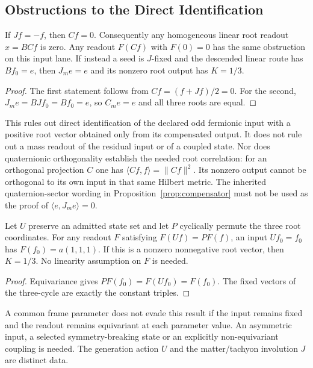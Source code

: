 \subsection{Obstructions to the Direct Identification}
\label{v480:hc-mass-obstructions}

\begin{proposition}
\label{v480:hc-mass-odd-obstruction}
If $Jf=-f$, then $Cf=0$. Consequently any homogeneous linear
root readout $x=BCf$ is zero. Any readout $F(Cf)$ with $F(0)=0$
has the same obstruction on this input lane. If instead a seed is
$J$-fixed and the descended linear route has $Bf_0=e$, then
$J_me=e$ and its nonzero root output has $K=1/3$.
\end{proposition}
\begin{proof}
The first statement follows from $Cf=(f+Jf)/2=0$.
For the second, $J_me=BJf_0=Bf_0=e$, so $C_me=e$ and
all three roots are equal.
\end{proof}

This rules out direct identification of the declared odd fermionic
input with a positive root vector obtained only from its compensated
output. It does not rule out a mass readout of the residual input or
of a coupled state. Nor does quaternionic orthogonality establish the
needed root correlation: for an orthogonal projection $C$ one has
$\langle Cf,f\rangle=\|Cf\|^2$. Its nonzero output cannot be
orthogonal to its own input in that same Hilbert metric. The inherited
quaternion-sector wording in Proposition~\ref{prop:compensator} must
not be used as the proof of $\langle e,J_me\rangle=0$.

\begin{proposition}
\label{v480:hc-mass-equivariant-obstruction}
Let $U$ preserve an admitted state set and let $P$ cyclically permute
the three root coordinates. For any readout $F$ satisfying
$F(Uf)=PF(f)$, an input $Uf_0=f_0$ has
$F(f_0)=a(1,1,1)$. If this is a nonzero nonnegative root vector,
then $K=1/3$. No linearity assumption on $F$ is needed.
\end{proposition}
\begin{proof}
Equivariance gives $PF(f_0)=F(Uf_0)=F(f_0)$. The fixed vectors
of the three-cycle are exactly the constant triples.
\end{proof}

A common frame parameter does not evade this result if the input
remains fixed and the readout remains equivariant at each parameter
value. An asymmetric input, a selected symmetry-breaking state or
an explicitly non-equivariant coupling is needed. The generation
action $U$ and the matter/tachyon involution $J$ are distinct data.

